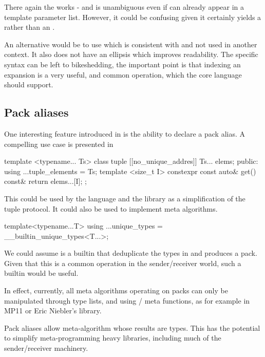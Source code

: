 \documentclass{wg21}
\begin{document}
There again the  works - and is unambiguous even if  can already appear in a template parameter list.
However, it could be confusing given it certainly yields a  rather than an .

An alternative would be to use \tcode{[:]} which is consistent with  and not used in another context.
It also does not have an ellipsis which improves readability.
The specific syntax can be left to bikeshedding, the important point is that indexing an expansion is a very useful, and common operation,
which the core language should support.


\subsection{Pack aliases}

One interesting feature introduced in  is the ability to declare a pack alias.
A compelling use case is presented in 

\begin{colorblock}
    template <typename... Ts>
    class tuple {
        [[no_unique_addres]] Ts... elems;
    public:
        using ...tuple_elements = Ts;
        template <size_t I>
        constexpr const auto& get() const& {
            return elems...[I];
        }
    };
\end{colorblock}

This could be used by the language and the library as a simplification of the tuple protocol.
It could also be used to implement meta algorithms.

\begin{colorblock}
    template<typename...T>
    using ...unique_types = __builtin_unique_types<T...>;
\end{colorblock}

We could assume  is a builtin that deduplicate the types in  and produces a pack.
Given that this is a common operation in the sender/receiver world, such a builtin would be useful.

In effect, currently, all meta algorithms operating on packs can only be manipulated through type lists,
and using / meta functions, as for example in MP11 or Eric Niebler's  library.

Pack aliases allow meta-algorithm whose results are types.
This has the potential to simplify meta-programming heavy libraries, including much of the sender/receiver machinery.
\end{document}
